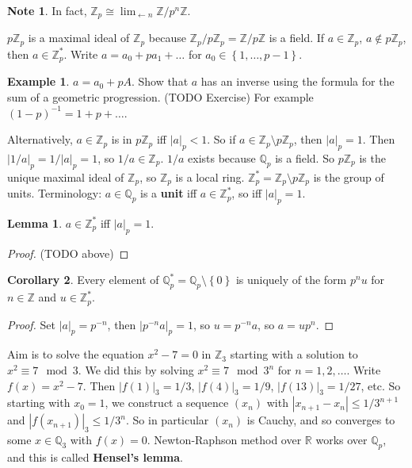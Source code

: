 \documentclass{article}
\newcommand{\Z}{\mathbb{Z}}
\newcommand{\Q}{\mathbb{Q}}
\newcommand{\R}{\mathbb{R}}
\newcommand{\rb}[1]{\left( #1 \right)}
\newcommand{\cb}[1]{\left\{ #1 \right\}}
\newcommand{\abs}[1]{\left\lvert #1 \right\rvert}
\theoremstyle{definition}\newtheorem{definition}{Definition}[section]
\theoremstyle{definition}\newtheorem{remark}[definition]{Remark}
\theoremstyle{definition}\newtheorem*{example}{Example}
\theoremstyle{definition}\newtheorem*{note}{Note}
\newtheorem{lemma}[definition]{Lemma}
\newtheorem{corollary}[definition]{Corollary}
\begin{document}
\begin{note}
In fact, $ \Z_p \cong \lim_{\leftarrow n} \Z / p^n\Z $.
\end{note}

$ p\Z_p $ is a maximal ideal of $ \Z_p $ because $ \Z_p / p\Z_p = \Z / p\Z $ is a field. If $ a \in \Z_p $, $ a \notin p\Z_p $, then $ a \in \Z_p^* $. Write $ a = a_0 + pa_1 + \dots $ for $ a_0 \in \cb{1, \dots, p - 1} $.

\begin{example}
$ a = a_0 + pA $. Show that $ a $ has an inverse using the formula for the sum of a geometric progression. (TODO Exercise) For example $ \rb{1 - p}^{-1} = 1 + p + \dots $.
\end{example}

Alternatively, $ a \in \Z_p $ is in $ p\Z_p $ iff $ \abs{a}_p < 1 $. So if $ a \in \Z_p \setminus p\Z_p $, then $ \abs{a}_p = 1 $. Then $ \abs{1 / a}_p = 1 / \abs{a}_p = 1 $, so $ 1 / a \in \Z_p $. $ 1 / a $ exists because $ \Q_p $ is a field. So $ p\Z_p $ is the unique maximal ideal of $ \Z_p $, so $ \Z_p $ is a local ring. $ \Z_p^* = \Z_p \setminus p\Z_p $ is the group of units. Terminology: $ a \in \Q_p $ is a \textbf{unit} iff $ a \in \Z_p^* $, so iff $ \abs{a}_p = 1 $.

\begin{lemma}
$ a \in \Z_p^* $ iff $ \abs{a}_p = 1 $.
\end{lemma}

\begin{proof}
(TODO above)
\end{proof}

\begin{corollary}
Every element of $ \Q_p^* = \Q_p \setminus \cb{0} $ is uniquely of the form $ p^nu $ for $ n \in \Z $ and $ u \in \Z_p^* $.
\end{corollary}

\begin{proof}
Set $ \abs{a}_p = p^{-n} $, then $ \abs{p^{-n}a}_p = 1 $, so $ u = p^{-n}a $, so $ a = up^n $.
\end{proof}

Aim is to solve the equation $ x^2 - 7 = 0 $ in $ \Z_3 $ starting with a solution to $ x^2 \equiv 7 \mod 3 $. We did this by solving $ x^2 \equiv 7 \mod 3^n $ for $ n = 1, 2, \dots $. Write $ f\rb{x} = x^2 - 7 $. Then $ \abs{f\rb{1}}_3 = 1 / 3 $, $ \abs{f\rb{4}}_3 = 1 / 9 $, $ \abs{f\rb{13}}_3 = 1 / 27 $, etc. So starting with $ x_0 = 1 $, we construct a sequence $ \rb{x_n} $ with $ \abs{x_{n + 1} - x_n} \le 1 / 3^{n + 1} $ and $ \abs{f\rb{x_{n + 1}}}_3 \le 1 / 3^n $. So in particular $ \rb{x_n} $ is Cauchy, and so converges to some $ x \in \Q_3 $ with $ f\rb{x} = 0 $. Newton-Raphson method over $ \R $ works over $ \Q_p $, and this is called \textbf{Hensel's lemma}.
\end{document}
